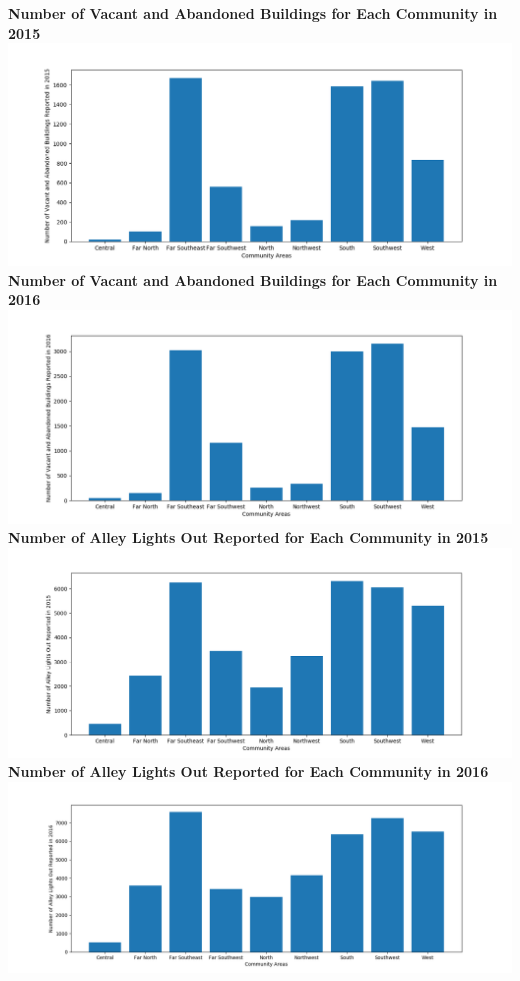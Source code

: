 \documentclass[letterpaper,12pt]{article}
\begin{document}
\newpage
\noindent \textbf{Number of Vacant and Abandoned Buildings for Each Community in 2015} \\
\includegraphics[scale=.6]{build15.png}
\noindent \textbf{Number of Vacant and Abandoned Buildings for Each Community in 2016} \\
\includegraphics[scale=.6]{build16.png}
\newpage
\noindent \textbf{Number of Alley Lights Out Reported for Each Community in 2015} \\
\includegraphics[scale=.6]{alleys15.png}
\noindent \textbf{Number of Alley Lights Out Reported for Each Community in 2016} \\
\includegraphics[scale=.55]{alleys16.png}
\end{document}
